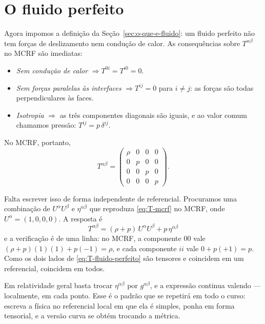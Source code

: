 \documentclass[12pt,a4paper,oneside]{book}
\theoremstyle{rgplain}
\theoremstyle{rgremark}
\begin{document}
\section{O fluido perfeito}
\label{sec:fluido-perfeito}

Agora impomos a definição da Seção~\ref{sec:o-que-e-fluido}: um fluido
perfeito não tem forças de deslizamento nem condução de calor. As
consequências sobre $T^{\alpha\beta}$ no MCRF são imediatas:

\begin{itemize}
  \item \emph{Sem condução de calor} $\Rightarrow T^{0i}=T^{i0}=0$.
  \item \emph{Sem forças paralelas às interfaces} $\Rightarrow T^{ij}=0$ para
  $i\ne j$: as forças são todas perpendiculares às faces.
  \item \emph{Isotropia} $\Rightarrow$ as três componentes diagonais são
  iguais, e ao valor comum chamamos pressão: $T^{ij}=p\,\delta^{ij}$.
\end{itemize}
No MCRF, portanto,
\begin{equation}
  T^{\alpha\beta}=
  \begin{pmatrix}
    \rho&0&0&0\\ 0&p&0&0\\ 0&0&p&0\\ 0&0&0&p
  \end{pmatrix} .
  \label{eq:T-mcrf}
\end{equation}

Falta escrever isso de forma independente de referencial. Procuramos uma
combinação de $U^\alpha U^\beta$ e $\eta^{\alpha\beta}$ que reproduza
\eqref{eq:T-mcrf} no MCRF, onde $U^\alpha=(1,0,0,0)$. A resposta é
\begin{equation}
  \boxed{\ T^{\alpha\beta}=(\rho+p)\,U^\alpha U^\beta+p\,\eta^{\alpha\beta}\ }
  \label{eq:T-fluido-perfeito}
\end{equation}
e a verificação é de uma linha: no MCRF, a componente $00$ vale
$(\rho+p)(1)(1)+p(-1)=\rho$, e cada componente $ii$ vale $0+p(+1)=p$. Como os
dois lados de \eqref{eq:T-fluido-perfeito} são tensores e coincidem em um
referencial, coincidem em todos.

\begin{atencao}
Em relatividade geral basta trocar $\eta^{\alpha\beta}$ por
$g^{\alpha\beta}$, e a expressão continua valendo --- localmente, em cada
ponto. Esse é o padrão que se repetirá em todo o curso: escreva a física no
referencial local em que ela é simples, ponha em forma tensorial, e a versão
curva se obtém trocando a métrica.
\end{atencao}
\end{document}
